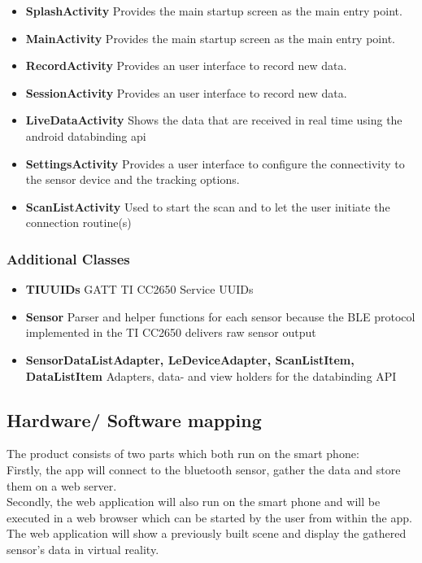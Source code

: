\begin{itemize} %
  \item \textbf{SplashActivity} Provides the main startup screen as the main entry point.
  \item \textbf{MainActivity} Provides the main startup screen as the main entry point.
  \item \textbf{RecordActivity} Provides an user interface to record new data.
  \item \textbf{SessionActivity} Provides an user interface to record new data.
  \item \textbf{LiveDataActivity} Shows the data that are received in real time using the android databinding api
  \item \textbf{SettingsActivity} Provides a user interface to configure the connectivity to the sensor device and the tracking options.
  \item \textbf{ScanListActivity} Used to start the scan and to let the user initiate the connection routine(s)
\end{itemize}

\subsubsection{Additional Classes}
\begin{itemize}
  \item \textbf{TIUUIDs} GATT TI CC2650 Service UUIDs
  \item \textbf{Sensor} Parser and helper functions for each sensor because the BLE protocol implemented in the TI CC2650 delivers raw sensor output
  \item \textbf{SensorDataListAdapter, LeDeviceAdapter, ScanListItem, DataListItem} Adapters, data- and view holders for the databinding API
\end{itemize}

\subsection{Hardware/ Software mapping}

The product consists of two parts which both run on the smart phone: \\
Firstly, the app will connect to the bluetooth sensor, gather the data and store them on a web server. \\
Secondly, the web application will also run on the smart phone and will be executed in a web browser which can be started by the user from within the app. The web application will show a previously built scene and display the gathered sensor's data in virtual reality.

